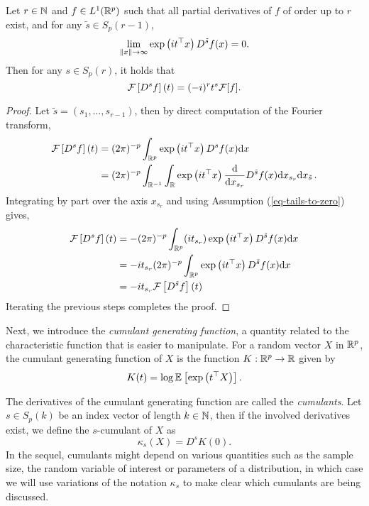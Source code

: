 \begin{lemma} \label{lemma-fourier-derivative}
    Let $r \in \N$ and $f \in L^1(\Rp)$ such that all partial derivatives of $f$ of order up to $r$ exist, and for any $\tilde{s} \in S_p(r-1)$,
    \begin{equation} \label{eq-tails-to-zero}
        \lim_{\norm{x} \rightarrow \infty} \expf{it^\top x}D^{\tilde{s}}f(x) = 0.
    \end{equation}
    Then for any $s \in S_p(r)$, it holds that
    \begin{equation*}
        \F\left[D^s f \right](t) = (-i)^r t^s \F[f].
    \end{equation*}
\end{lemma}
\begin{proof}
    Let $\tilde{s} = (s_1, \ldots, s_{r-1})$, then by direct computation of the Fourier transform,
    \begin{align*}
        \F\left[D^s f \right](t) 
        &= (2\pi)^{-p}\intRp{x}{ \expf{it^\top x} D^s f(x) } \\
        &= (2\pi)^{-p}\int_{\R^{-1}} \int_\R 
            \expf{it^\top x} \ddx{x_{s_r}} D^{\tilde{s}} f(x) 
        \d x_{s_r} \d x_{\tilde{s}}\,.
    \end{align*}
    Integrating by part over the axis $x_{s_r}$ and using Assumption (\ref{eq-tails-to-zero}) gives,
    \begin{align*}
        \F\left[D^s f \right](t)  
        &= - (2\pi)^{-p}\intRp{x}{
            (it_{s_r})\expf{it^\top x} D^{\tilde{s}} f(x)
        } \\
        &= -it_{s_r} (2\pi)^{-p}\intRp{x}{
            \expf{it^\top x} D^{\tilde{s}} f(x)
        } \\
        &= -it_{s_r} \F\left[D^{\tilde{s}} f \right](t)
    \end{align*}
    Iterating the previous steps completes the proof.
\end{proof}

Next, we introduce the \textit{cumulant generating function}, a quantity related to the characteristic function that is easier to manipulate. For a random vector $X$ in $\Rp$, the cumulant generating function of $X$ is the function $K : \Rp \rightarrow \R$ given by
\begin{equation*}
    K(t) = \log \expec{}{\expf{t^\top X}}.
\end{equation*}

The derivatives of the cumulant generating function are called the \textit{cumulants}. Let $s \in S_p(k)$ be an index vector of length $k \in \N$, then if the involved derivatives exist, we define the $s$-cumulant of $X$ as
\begin{equation*}
    \kappa_s(X) = D^s K(0).
\end{equation*}
In the sequel, cumulants might depend on various quantities such as the sample size, the random variable of interest or parameters of a distribution, in which case we will use variations of the notation $\kappa_s$ to make clear which cumulants are being discussed.

